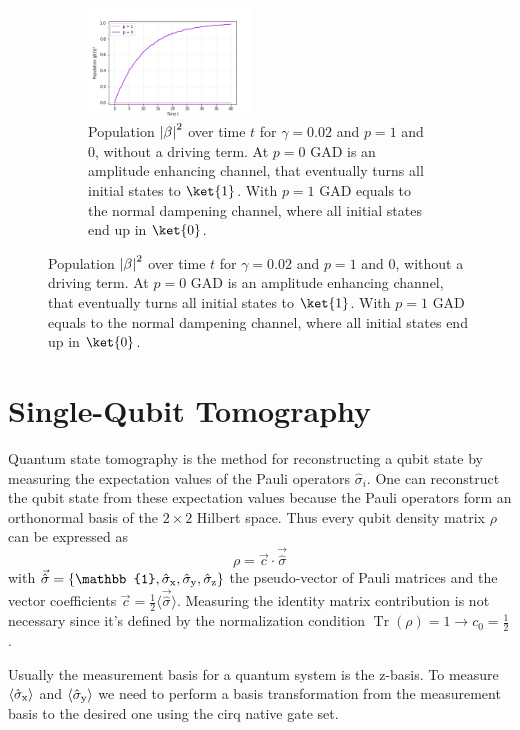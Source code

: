 \begin{figure}[h]
\begin{subfigure}[t]{0.48\textwidth}
        \label{fig:exercise07_03}
    \end{subfigure}
    \\
    \begin{subfigure}[b]{\textwidth}
        \centering
        \includegraphics[width=0.48\textwidth]{tex/figures/exercise07_04.png}
        \caption{Population $\left|\beta\right|^2$ over time $t$ for $\gamma = 0.02$ and $p = 1$ and $0$, without a driving term. At $p = 0$ GAD is an amplitude enhancing channel, that eventually turns all initial states to $\ket{1}$. With $p = 1$ GAD equals to the normal dampening channel, where all initial states end up in $\ket{0}$.}
        \label{fig:exercise07_04}
    \end{subfigure}
\end{figure}

\section{Single-Qubit Tomography}
Quantum state tomography is the method for reconstructing a qubit state by measuring the expectation values of the Pauli operators $\hat{\sigma}_i$. One can reconstruct the qubit state from these expectation values because the Pauli operators form an orthonormal basis of the $2\times2$ Hilbert space. Thus every qubit density matrix $\rho$ can be expressed as
\begin{equation}
    \rho = \Vec{c} \cdot \Vec{\hat{\sigma}}
\end{equation}
with $\Vec{\hat{\sigma}} = \{\mathbb{1}, \sigmax,\sigmay, \sigmaz\}$ the pseudo-vector of Pauli matrices and the vector coefficients  $\vec{c} = \frac{1}{2}\langle\Vec{\hat{\sigma}}\rangle$. Measuring the identity matrix contribution is not necessary since it's defined by the normalization condition $\operatorname{Tr}(\rho) =1 \rightarrow c_0 = \frac{1}{2}$. 

Usually the measurement basis for a quantum system is the z-basis. To measure $\langle\sigmax\rangle$ and $\langle\sigmay\rangle$ we need to perform a basis transformation from the measurement basis to the desired one using the cirq native gate set.
